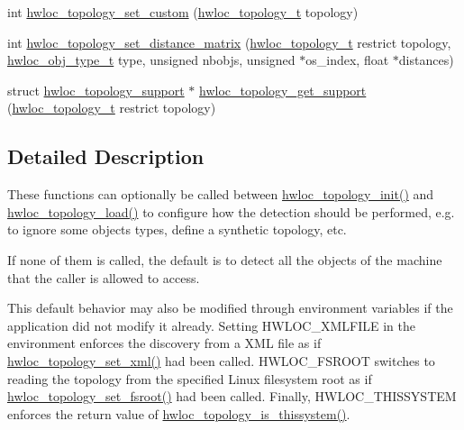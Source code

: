 \begin{DoxyCompactItemize}
\item 
 int \hyperlink{a00044_ga12024fec46f9368fb8fc5c624089c5ec}{hwloc\_\-topology\_\-set\_\-custom} (\hyperlink{a00039_ga9d1e76ee15a7dee158b786c30b6a6e38}{hwloc\_\-topology\_\-t} topology)
\item 
 int \hyperlink{a00044_gabda6afa67a495cd652f064ad51d3fe47}{hwloc\_\-topology\_\-set\_\-distance\_\-matrix} (\hyperlink{a00039_ga9d1e76ee15a7dee158b786c30b6a6e38}{hwloc\_\-topology\_\-t} restrict topology, \hyperlink{a00041_gacd37bb612667dc437d66bfb175a8dc55}{hwloc\_\-obj\_\-type\_\-t} type, unsigned nbobjs, unsigned $\ast$os\_\-index, float $\ast$distances)
\item 
 struct \hyperlink{a00026}{hwloc\_\-topology\_\-support} $\ast$ \hyperlink{a00044_gac2126e105f3ae708efca2e90d612625a}{hwloc\_\-topology\_\-get\_\-support} (\hyperlink{a00039_ga9d1e76ee15a7dee158b786c30b6a6e38}{hwloc\_\-topology\_\-t} restrict topology)
\end{DoxyCompactItemize}


\subsection{Detailed Description}
These functions can optionally be called between \hyperlink{a00043_ga5c2d6f476af87005c7bd0811d4548b9f}{hwloc\_\-topology\_\-init()} and \hyperlink{a00043_ga91e2e6427b95fb7339c99dbbef996e71}{hwloc\_\-topology\_\-load()} to configure how the detection should be performed, e.g. to ignore some objects types, define a synthetic topology, etc.

If none of them is called, the default is to detect all the objects of the machine that the caller is allowed to access.

This default behavior may also be modified through environment variables if the application did not modify it already. Setting HWLOC\_\-XMLFILE in the environment enforces the discovery from a XML file as if \hyperlink{a00044_ga93efcc8a962afe1ed23393700682173f}{hwloc\_\-topology\_\-set\_\-xml()} had been called. HWLOC\_\-FSROOT switches to reading the topology from the specified Linux filesystem root as if \hyperlink{a00044_ga2f6bfb6958d8b508ea1d7d5bb266432c}{hwloc\_\-topology\_\-set\_\-fsroot()} had been called. Finally, HWLOC\_\-THISSYSTEM enforces the return value of \hyperlink{a00046_ga0d109e33fc7990f62f665d336e5e5111}{hwloc\_\-topology\_\-is\_\-thissystem()}. 

